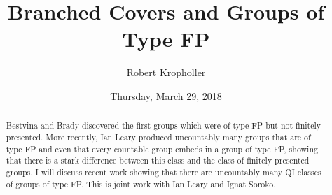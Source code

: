 \documentclass{UAmathtalk}
\author{Robert Kropholler}
\title{Branched Covers and Groups of Type FP}
\date{Thursday, March 29, 2018}
\begin{document}
\maketitle


\begin{abstract}
Bestvina and Brady discovered the first groups which were of type FP but not finitely presented. More recently, Ian Leary produced uncountably many groups that are of type FP and even that every countable group embeds in a group of type FP, showing that there is a stark difference between this class and the class of finitely presented groups. I will discuss recent work showing that there are uncountably many QI classes of groups of type FP. This is joint work with Ian Leary and Ignat Soroko.
\end{abstract}
\end{document}
